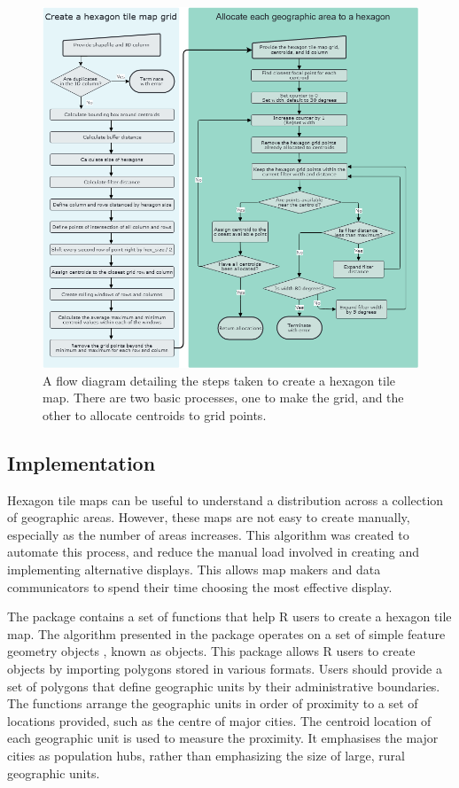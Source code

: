 \begin{Schunk}
\begin{figure}
\includegraphics[width=1\linewidth]{figs/sugarbag_flow} \caption[A flow diagram detailing the steps taken to create a hexagon tile map]{A flow diagram detailing the steps taken to create a hexagon tile map. There are two basic processes, one to make the grid, and the other to allocate centroids to grid points.}\label{fig:sugarbagflow}
\end{figure}
\end{Schunk}

\hypertarget{implementation}{%
\subsection{Implementation}\label{implementation}}

Hexagon tile maps can be useful to understand a distribution across a
collection of geographic areas. However, these maps are not easy to
create manually, especially as the number of areas increases. This
algorithm was created to automate this process, and reduce the manual
load involved in creating and implementing alternative displays. This
allows map makers and data communicators to spend their time choosing
the most effective display.

The  package contains a set of functions that help R users
to create a hexagon tile map. The algorithm presented in the
 package operates on a set of simple feature geometry
objects , known as  objects\citep{sf}. This package allows R
users to create  objects by importing polygons stored in various
formats. Users should provide a set of polygons that define geographic
units by their administrative boundaries. The functions arrange the
geographic units in order of proximity to a set of locations provided,
such as the centre of major cities. The centroid location of each
geographic unit is used to measure the proximity. It emphasises the
major cities as population hubs, rather than emphasizing the size of
large, rural geographic units.

